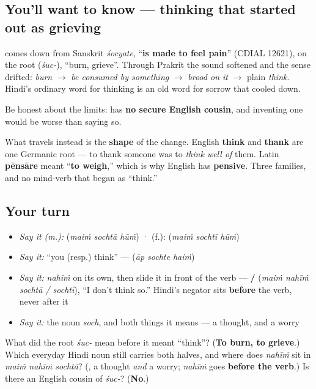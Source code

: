 \subsection*{You'll want to know — thinking that started out as grieving}
\textbf{} comes down from Sanskrit \emph{śocyate}, \textquotedblleft{}\textbf{is made to feel pain}\textquotedblright{} (CDIAL 12621), on the root \textbf{} (\emph{śuc-}), \textquotedblleft{}burn, grieve\textquotedblright{}. Through Prakrit the sound softened and the sense drifted: \emph{burn} $\to$ \emph{be consumed by something} $\to$ \emph{brood on it} $\to$ plain \emph{think}. Hindi's ordinary word for thinking is an old word for sorrow that cooled down.

Be honest about the limits: \textbf{} has \textbf{no secure English cousin}, and inventing one would be worse than saying so.

What travels instead is the \textbf{shape} of the change. English \textbf{think} and \textbf{thank} are one Germanic root — to thank someone was to \emph{think well of} them. Latin \textbf{pēnsāre} meant \textquotedblleft{}\textbf{to weigh},\textquotedblright{} which is why English has \textbf{pensive}. Three families, and no mind-verb that began as \textquotedblleft{}think.\textquotedblright{}

\subsection*{Your turn}
\begin{itemize}
\raggedright
  \item \emph{Say it (m.):} \textbf{  } (\emph{maiṁ sochtā hūṁ})  ·  (f.): \textbf{  } (\emph{maiṁ sochtī hūṁ})
  \item \emph{Say it:} \textquotedblleft{}you (resp.) think\textquotedblright{} — \textbf{  } (\emph{āp sochte haiṁ})
  \item \emph{Say it:} \emph{nahīṁ} on its own, then slide it in front of the verb — \textbf{   / } (\emph{maiṁ nahīṁ sochtā / sochtī}), \textquotedblleft{}I don't think so.\textquotedblright{} Hindi's negator sits \textbf{before} the verb, never after it
  \item \emph{Say it:} the noun \emph{soch}, and both things it means — a thought, and a worry
\end{itemize}

\begin{tcolorbox}[breakable,colback=teal!4,colframe=teal!35!black,title={Before you move on}]
What did the root \emph{śuc-} mean before it meant \textquotedblleft{}think\textquotedblright{}? (\textbf{To burn, to grieve}.) Which everyday Hindi noun still carries both halves, and where does \emph{nahīṁ} sit in \emph{maiṁ nahīṁ sochtā}? (\textbf{}, a thought \emph{and} a worry; \emph{nahīṁ} goes \textbf{before the verb}.) Is there an English cousin of \emph{śuc-}? (\textbf{No}.)
\end{tcolorbox}
